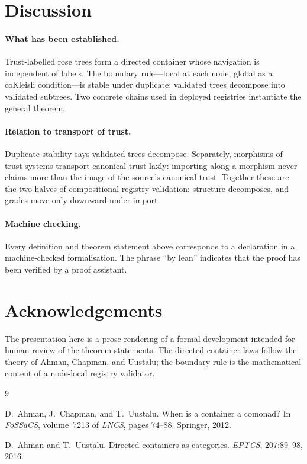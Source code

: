 \documentclass[11pt,a4paper]{article}
\theoremstyle{plain}
\theoremstyle{definition}
\begin{document}
\section{Discussion}

\paragraph{What has been established.}
Trust-labelled rose trees form a directed container whose navigation is
independent of labels. The boundary rule---local at each node, global
as a coKleisli condition---is stable under $\mathrm{duplicate}$:
validated trees decompose into validated subtrees. Two concrete chains
used in deployed registries instantiate the general theorem.

\paragraph{Relation to transport of trust.}
Duplicate-stability says validated trees decompose. Separately, morphisms
of trust systems transport canonical trust laxly: importing along a
morphism never claims more than the image of the source's canonical
trust. Together these are the two halves of compositional registry
validation: structure decomposes, and grades move only downward under
import.

\paragraph{Machine checking.}
Every definition and theorem statement above corresponds to a declaration
in a machine-checked formalisation. The phrase ``by lean'' indicates that
the proof has been verified by a proof assistant.

\section*{Acknowledgements}

The presentation here is a prose rendering of a formal development
intended for human review of the theorem statements. The directed
container laws follow the theory of Ahman, Chapman, and Uustalu; the
boundary rule is the mathematical content of a node-local registry
validator.

\begin{thebibliography}{9}

D.~Ahman, J.~Chapman, and T.~Uustalu.
\newblock When is a container a comonad?
\newblock In \emph{FoSSaCS}, volume~7213 of \emph{LNCS}, pages 74--88.
\newblock Springer, 2012.

D.~Ahman and T.~Uustalu.
\newblock Directed containers as categories.
\newblock \emph{EPTCS}, 207:89--98, 2016.

\end{thebibliography}
\end{document}
